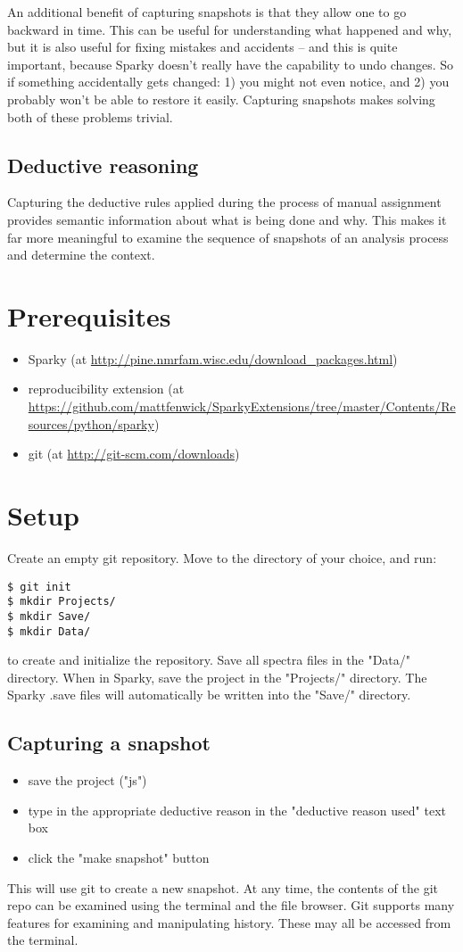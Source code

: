 \documentclass[11pt,a4paper]{article}
\begin{document}
An additional benefit of capturing snapshots is that they allow one to go 
backward in time.  This can be useful for understanding what happened and
why, but it is also useful for fixing mistakes and accidents -- and this is
quite important, because Sparky doesn't really have the capability to undo
changes.  So if something accidentally gets changed: 1) you might not even
notice, and 2) you probably won't be able to restore it easily.  Capturing
snapshots makes solving both of these problems trivial.

\subsection{Deductive reasoning}
Capturing the deductive rules applied during the process of manual assignment
provides semantic information about what is being done and why.  This makes it
far more meaningful to examine the sequence of snapshots of an analysis
process and determine the context.


\section{Prerequisites}
\begin{itemize}
  \item Sparky
    (at \url{http://pine.nmrfam.wisc.edu/download_packages.html})
  \item reproducibility extension
    (at \url{https://github.com/mattfenwick/SparkyExtensions/tree/master/Contents/Resources/python/sparky})
  \item git
    (at \url{http://git-scm.com/downloads})
\end{itemize}


\section{Setup}
Create an empty git repository.  Move to the directory of your choice, and
run:
\begin{verbatim}
$ git init
$ mkdir Projects/
$ mkdir Save/
$ mkdir Data/
\end{verbatim} 
to create and initialize the repository.  
Save all spectra files in the "Data/" directory.
When in Sparky, save the project in the "Projects/" directory.
The Sparky .save files will automatically be written into the "Save/"
directory.

\subsection{Capturing a snapshot}
\begin{itemize}
  \item save the project ("js")
  \item type in the appropriate deductive reason in the "deductive reason used"
    text box
  \item click the "make snapshot" button
\end{itemize}
This will use git to create a new snapshot.  At any time, the contents of
the git repo can be examined using the terminal and the file browser.  Git
supports many features for examining and manipulating history.  These may
all be accessed from the terminal.
\end{document}
